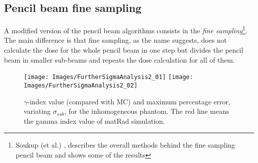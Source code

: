 \documentclass[12pt, a4paper, twoside]{book}
\begin{document}
\subsection{Pencil beam fine sampling}\label{FS}
A modified version of the pencil beam algorithms consists in the \emph{fine sampling}\footnote{Soukup (et al.) \cite{souk:pba}, describes the overall methods behind the fine sampling pencil beam and shows some of the results}.
The main difference is that fine sampling, as the name suggests, does not calculate the dose for the whole pencil beam in one step but divides the pencil beam in smaller sub-beams and repeats the dose calculation for all of them. 
\begin{figure}[t]
{\texttt{[image: Images/FurtherSigmaAnalysis2\_01]}}
{\texttt{[image: Images/FurtherSigmaAnalysis2\_02]}}
\caption{$\gamma$-index value (compared with MC) and maximum percentage error, variating $\sigma_{sub}$, for the inhomogeneous phantom. The red line means the gamma index value of matRad simulation.}
\label{fig:sigsub}
\end{figure}
\end{document}
